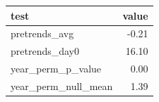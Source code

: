\begin{tabular}{lr}
\toprule
test & value \\
\midrule
pretrends\_avg & -0.21 \\
pretrends\_day0 & 16.10 \\
year\_perm\_p\_value & 0.00 \\
year\_perm\_null\_mean & 1.39 \\
\bottomrule
\end{tabular}

